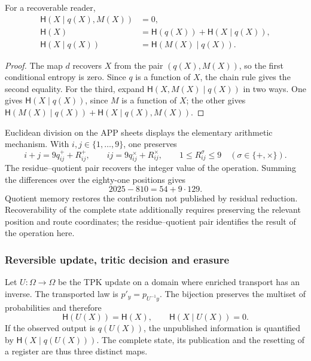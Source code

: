 \begin{proposition}
For a recoverable reader,
\begin{align}
 \mathsf H(X\mid q(X),M(X))&=0,\\
 \mathsf H(X)&=\mathsf H(q(X))+\mathsf H(X\mid q(X)),\\
 \mathsf H(X\mid q(X))&=\mathsf H(M(X)\mid q(X)).
 \label{ii:eq:ii-kb-aut-fibra}
\end{align}
\end{proposition}
\begin{proof}
The map \(d\) recovers \(X\) from the pair \((q(X),M(X))\),
so the first conditional entropy is zero. Since \(q\) is
a function of \(X\), the chain rule gives the second equality.
For the third, expand
\(\mathsf H(X,M(X)\mid q(X))\) in two ways. One gives
\(\mathsf H(X\mid q(X))\), since \(M\) is a function of \(X\);
the other gives
\(\mathsf H(M(X)\mid q(X))+\mathsf H(X\mid q(X),M(X))\).
\end{proof}

Euclidean division on the APP sheets displays the elementary
arithmetic mechanism. With \(i,j\in\{1,\ldots,9\}\), one preserves
\[
 i+j=9q^+_{ij}+R^+_{ij},\qquad
 ij=9q^\times_{ij}+R^\times_{ij},\qquad
 1\leq R^\sigma_{ij}\leq9\quad(\sigma\in\{+,\times\}).
\]
The residue--quotient pair recovers the integer value of the operation.
Summing the differences over the eighty-one positions gives
\[
 2025-810=54+9\cdot129.
\]
Quotient memory restores the contribution not published by
residual reduction. Recoverability of the complete state additionally
requires preserving the relevant position and route coordinates;
the residue--quotient pair identifies the result of the operation here.

\subsubsection{Reversible update, tritic decision and erasure}

Let \(U:\Omega\to\Omega\) be the TPK update on a domain where
enriched transport has an inverse. The transported law is
\(p'_y=p_{U^{-1}y}\). The bijection preserves the multiset of
probabilities and therefore
\begin{equation}
 \mathsf H(U(X))=\mathsf H(X),\qquad
 \mathsf H(X\mid U(X))=0.
 \label{ii:eq:ii-kb-aut-reversible}
\end{equation}
If the observed output is \(q(U(X))\), the unpublished information
is quantified by \(\mathsf H(X\mid q(U(X)))\). The complete state,
its publication and the resetting of a register are thus three distinct maps.


